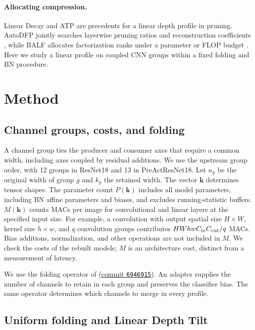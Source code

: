 \documentclass[11pt,a4paper]{article}
\begin{document}
\paragraph{Allocating compression.}
Linear Decay \citep[Appendix~C.2]{su2020random} and ATP
\citep[Eq.~10 and Appendix~F]{huang2025atp} are precedents for a linear
depth profile in pruning.
AutoDFP jointly searches layerwise pruning ratios and reconstruction
coefficients \citep[Table~I]{li2024autodfp}, while BALF allocates
factorization ranks under a parameter or FLOP budget
\citep[Sec.~4.3]{gonzalez2026balf}. Here we study a linear profile on
coupled CNN groups within a fixed folding and BN procedure.

\section{Method}
\label{sec:method}

\subsection{Channel groups, costs, and folding}

A channel group ties the producer and consumer axes that require a
common width, including axes coupled by residual additions. We use the
upstream group order, with 12 groups in ResNet18 and 13 in
PreActResNet18. Let $n_g$ be the original width of group $g$ and $k_g$ the
retained width. The vector $\mathbf k$ determines tensor shapes. The
parameter count $P(\mathbf k)$ includes all model parameters, including
BN affine parameters and biases, and excludes running-statistic buffers.
$M(\mathbf k)$ counts MACs per image for convolutional and linear layers
at the specified input size. For example, a convolution with output
spatial size $H\times W$, kernel size $h\times w$, and $q$ convolution
groups contributes $HW hw C_{\rm in} C_{\rm out}/q$ MACs. Bias additions,
normalization, and other operations are not included in $M$. We check the
costs of the rebuilt models; $M$ is an architecture cost, distinct from a
measurement of latency.

We use the folding operator of \citet{saukh2026cut}
(\href{https://github.com/osaukh/folding_as_projection/tree/694691556e8314a835178a741938dd3d4d80c171}{commit \texttt{6946915}}).
An adapter supplies the number of channels to retain in each group and
preserves the classifier bias. The same operator determines which
channels to merge in every profile.

\subsection{Uniform folding and Linear Depth Tilt}
\label{sec:tilt}
\end{document}
